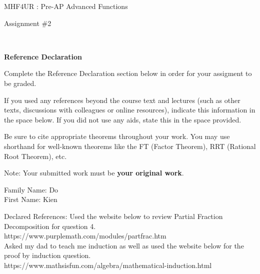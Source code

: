 \documentclass[12pt]{book}
\begin{document}
\vspace{-1.0in}\begin{center}
\Large{MHF4UR : Pre-AP Advanced Functions }

\Large{Assignment \#2}


\end{center}


\vspace{0.015in}\hrulefill\ 

\textbf{Reference Declaration} %

Complete the Reference Declaration section below in order for your assigment to be graded.

If you used any references beyond the course text and lectures (such as other texts, discussions with colleagues or online resources), indicate this information in the space below.  If you did not use any aids, state this in the space provided. 

Be sure to cite appropriate theorems throughout your work. You may use shorthand for well-known theorems like the FT (Factor Theorem), RRT (Rational Root Theorem), etc. 

Note: Your submitted work must be \textbf{your original work}. 

Family Name: Do\\%
First Name: Kien%

Declared References: Used the website below to review Partial Fraction Decomposition for question 4.\\ https://www.purplemath.com/modules/partfrac.htm\\
Asked my dad to teach me induction as well as used the website below for the proof by induction question.\\
https://www.mathsisfun.com/algebra/mathematical-induction.html\\


\vspace{0.015in}\hrulefill\ 

\newpage

\end{document}
